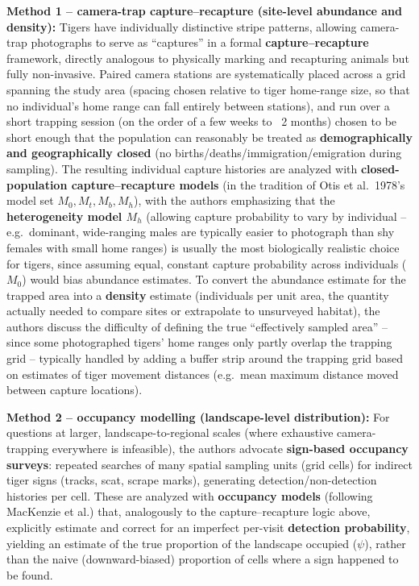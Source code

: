 \documentclass[11pt,a4paper]{article}
\begin{document}
\begin{papbox}
\textbf{Method 1 -- camera-trap capture--recapture (site-level abundance and density):} Tigers have individually distinctive stripe patterns, allowing camera-trap photographs to serve as ``captures'' in a formal \textbf{capture--recapture} framework, directly analogous to physically marking and recapturing animals but fully non-invasive. Paired camera stations are systematically placed across a grid spanning the study area (spacing chosen relative to tiger home-range size, so that no individual's home range can fall entirely between stations), and run over a short trapping session (on the order of a few weeks to ~2 months) chosen to be short enough that the population can reasonably be treated as \textbf{demographically and geographically closed} (no births/deaths/immigration/emigration during sampling). The resulting individual capture histories are analyzed with \textbf{closed-population capture--recapture models} (in the tradition of Otis et al.\ 1978's model set $M_0, M_t, M_b, M_h$), with the authors emphasizing that the \textbf{heterogeneity model $M_h$} (allowing capture probability to vary by individual -- e.g.\ dominant, wide-ranging males are typically easier to photograph than shy females with small home ranges) is usually the most biologically realistic choice for tigers, since assuming equal, constant capture probability across individuals ($M_0$) would bias abundance estimates. To convert the abundance estimate for the trapped area into a \textbf{density} estimate (individuals per unit area, the quantity actually needed to compare sites or extrapolate to unsurveyed habitat), the authors discuss the difficulty of defining the true ``effectively sampled area'' -- since some photographed tigers' home ranges only partly overlap the trapping grid -- typically handled by adding a buffer strip around the trapping grid based on estimates of tiger movement distances (e.g.\ mean maximum distance moved between capture locations).

\textbf{Method 2 -- occupancy modelling (landscape-level distribution):} For questions at larger, landscape-to-regional scales (where exhaustive camera-trapping everywhere is infeasible), the authors advocate \textbf{sign-based occupancy surveys}: repeated searches of many spatial sampling units (grid cells) for indirect tiger signs (tracks, scat, scrape marks), generating detection/non-detection histories per cell. These are analyzed with \textbf{occupancy models} (following MacKenzie et al.) that, analogously to the capture--recapture logic above, explicitly estimate and correct for an imperfect per-visit \textbf{detection probability}, yielding an estimate of the true proportion of the landscape occupied ($\psi$), rather than the naive (downward-biased) proportion of cells where a sign happened to be found.


\end{papbox}
\end{document}
